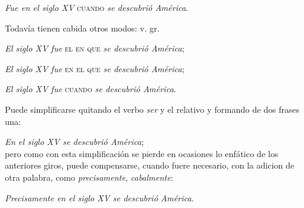 \documentclass{article}
\begin{document}
\emph{Fue en el siglo XV} \textsc{cuando} \emph{se descubrió América}.

Todavía tienen cabida otros modos: v. gr.

\emph{El siglo XV  fue} \textsc{el en que} \emph{se descubrió América};

\emph{El siglo XV  fue} \textsc{en el que} \emph{se descubrió América};

\emph{El siglo XV  fue} \textsc{cuando} \emph{se descubrió América}.

Puede simplificarse quitando el verbo \emph{ser} y el relativo y formando de dos frases una:

\emph{En el siglo XV se descubrió América};
\\
pero como con esta simplificación se pierde en ocasiones lo enfático de los anteriores giros, puede compensarse, 
cuando fuere necesario, con la adicion de otra palabra, como \emph{precisamente}, 
\emph{cabalmente}:

\emph{Precisamente en el siglo XV se descubrió América}.
\end{document}
